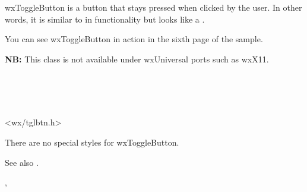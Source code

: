 
\section{}\label{wxtogglebutton}

wxToggleButton is a button that stays pressed when clicked by the user. In
other words, it is similar to  in
functionality but looks like a .

You can see wxToggleButton in action in the sixth page of the 
 sample.

{\bf NB:} This class is not available under wxUniversal ports such
as wxX11.


\\
\\
\\


<wx/tglbtn.h>


There are no special styles for wxToggleButton.

See also .


\twocolwidtha{7cm}
\begin{twocollist}\itemsep=0pt
\end{twocollist}


, 


\label{wxtogglebuttonconstr}

